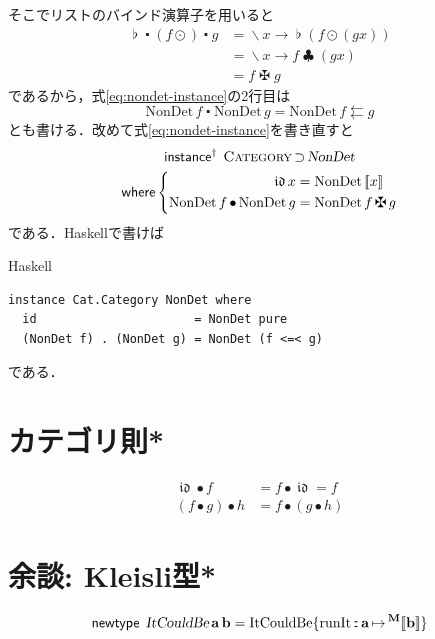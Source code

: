 \documentclass[a5paper,twoside,fleqn,draft]{jsbook}
\def\[{[\![}
\def\]{]\!]}
\newcommand{\programminglanguage}[1]{\textsf{#1}}
\newcommand{\haskell}{\programminglanguage{Haskell}}
\newenvironment{haskellcode}{\begin{itembox}[r]{\haskell}}{\end{itembox}}
\newcommand{\mKeyword}[1]{\mathsf{#1}}
\newcommand{\mInstanceDeclKeyword}{\mKeyword{instance}}
\newcommand{\mNewTypeDeclKeyword}{\mKeyword{newtype}}
\newcommand{\mWhereKeyword}{\mKeyword{where}}
\DeclareMathOperator{\mInstanceDeclPolymorphic}{\mInstanceDeclKeyword^{\dagger}}
\DeclareMathOperator{\mNewTypeDecl}{\mNewTypeDeclKeyword}
\DeclareMathOperator{\mSuperSet}{\supset}
\DeclareMathOperator{\mWhere}{\mWhereKeyword}
\newcommand{\mVarSpecialFunc}[1]{\mathfrak{#1}}
\DeclareMathOperator{\mIdCat}{\mVarSpecialFunc{id}}
\DeclareMathOperator{\mBindComp}{\maltese}
\DeclareMathOperator{\mBindList}{\clubsuit}
\DeclareMathOperator{\mComp}{\centerdot}
\DeclareMathOperator{\mCompCat}{\bullet}
\DeclareMathOperator{\mIn}{{:\!:}}
\DeclareMathOperator{\mJoinList}{\flat} %
\DeclareMathOperator{\mLambda}{\backslash}
\DeclareMathOperator{\mLambdaArrow}{\rightarrow}
\DeclareMathOperator{\mMapList}{\odot}
\DeclareMathOperator{\mMapsTo}{\mapsto}
\newcommand{\mType}[1]{\mathbf{#1}} %
\newcommand{\mA}{\mType{a}}
\newcommand{\mB}{\mType{b}}
\newcommand{\mTypeAssemble}[2]{{}^\mType{#1}\[\mType{#2}\]}
\newcommand{\mMaybeType}[1]{\mTypeAssemble{M}{#1}}
\newcommand{\mTypeConstructor}[1]{\textsl{#1}}
\newcommand{\mValueConstructor}[1]{\mathrm{#1}}
\newcommand{\mValueWith}[2]{\mValueConstructor{#1}\,#2}
\newcommand{\mValueRecordBeginWith}[1]{\mValueConstructor{#1}\{}
\newcommand{\mValueRecordEnd}{\}}
\newcommand{\mValueRecordWith}[2]{\mValueRecordBeginWith{#1}{#2}\mValueRecordEnd}
\newcommand{\mPureWith}[1]{\[#1\]}
\newcommand{\mTypeClass}[1]{\textsc{#1}} %
\newcommand{\mCategoryTypeClass}{\mTypeClass{Category}}
\begin{document}
そこでリストのバインド演算子を用いると
\begin{align}
  \mJoinList\mComp(f\mMapList)\mComp g
  &=\mLambda x\mLambdaArrow\mJoinList(f\mMapList(gx))\\
  &=\mLambda x\mLambdaArrow f\mBindList(gx)\\
  &=f\mBindComp g
\end{align}
であるから，式\eqref{eq:nondet-instance}の2行目は
\begin{equation}
  \mValueWith{NonDet}{f}\mComp\mValueWith{NonDet}{g}
  =\mValueWith{NonDet}{f\leftleftarrows g}
\end{equation}
とも書ける．改めて式\eqref{eq:nondet-instance}を書き直すと
\begin{multline}
  \mInstanceDeclPolymorphic\;
  \mCategoryTypeClass\mSuperSet\mTypeConstructor{NonDet}\\
  \mWhere\left\{
  \begin{aligned}
    \mIdCat x
    &=\mValueWith{NonDet}{\mPureWith{x}}\\
    \mValueWith{NonDet}{f}\mCompCat\mValueWith{NonDet}{g}
    &=\mValueWith{NonDet}{f\mBindComp g}
  \end{aligned}
  \right.
\end{multline}
である．\haskell で書けば
\begin{haskellcode}
\begin{verbatim}
instance Cat.Category NonDet where
  id                      = NonDet pure
  (NonDet f) . (NonDet g) = NonDet (f <=< g)
\end{verbatim}
\end{haskellcode}
である．

\section{カテゴリ則*}

\begin{align}
\mIdCat\mCompCat f&=f\mCompCat\mIdCat=f\\
(f\mCompCat g)\mCompCat h&=f\mCompCat(g\mCompCat h)
\end{align}

\section{余談: Kleisli型*}

\begin{equation}
  \mNewTypeDecl\;
  \mTypeConstructor{ItCouldBe}\,\mA\,\mB
  =\mValueRecordWith{ItCouldBe}{\mathrm{runIt}\mIn\mA\mMapsTo\mMaybeType{b}}
\end{equation}
\end{document}

